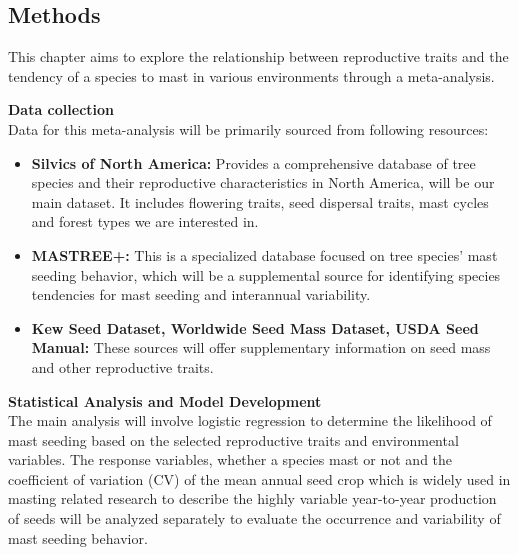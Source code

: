 \documentclass[11pt,letter]{article}
\begin{document}
\subsection{Methods}
This chapter aims to explore the relationship between reproductive traits and the tendency of a species to mast in various environments through a meta-analysis.\par
\textbf{Data collection}\\
Data for this meta-analysis will be primarily sourced from following resources:
	\begin{itemize}
	\item \textbf{Silvics of North America:} Provides a comprehensive database of tree species and their reproductive characteristics in North America, will be our main dataset. It includes flowering traits, seed dispersal traits, mast cycles and forest types we are interested in.
	\item \textbf{MASTREE+:} This is a specialized database focused on tree species' mast seeding behavior, which will be a supplemental source for identifying species tendencies for mast seeding and interannual variability.
	\item \textbf{Kew Seed Dataset, Worldwide Seed Mass Dataset, USDA Seed Manual:} These sources will offer supplementary information on seed mass and other reproductive traits.
	\end{itemize}
\textbf{Statistical Analysis and Model Development}\\
The main analysis will involve logistic regression to determine the likelihood of mast seeding based on the selected reproductive traits and environmental variables. The response variables, whether a species mast or not and the coefficient of variation (CV) of the mean annual seed crop  which is widely used in masting related research to describe the highly variable year-to-year production of seeds will be analyzed separately to evaluate the occurrence and variability of mast seeding behavior.
\end{document}
